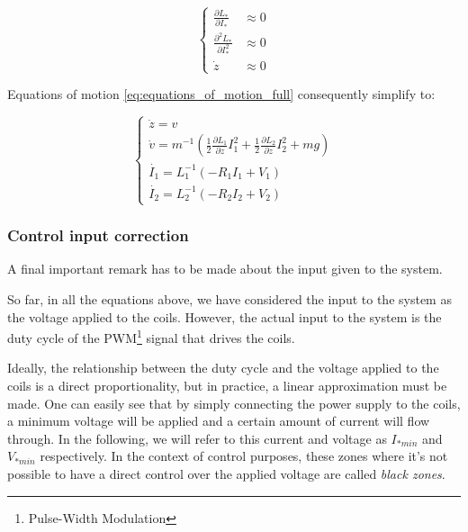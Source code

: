 \begin{equation}
    \begin{cases}
        \frac{\partial L_*}{\partial I_*}     & \approx 0 \\
        \frac{\partial^2 L_*}{\partial I_*^2} & \approx 0 \\
        \dot{z}                               & \approx 0
    \end{cases}
    \label{eq:model_reduction_conditions}
\end{equation}

Equations of motion \ref{eq:equations_of_motion_full} consequently simplify to:

\begin{equation}
    \begin{cases}
        \dot{z} = v                                                                                                                                 \\
        \dot{v} = m^{-1} \left(\frac{1}{2} \frac{\partial L_1}{\partial z} I_1^2 + \frac{1}{2} \frac{\partial L_2}{\partial z} I_2^2 + m g  \right) \\
        \dot{I_1} = L_1^{-1} \left(- R_1 I_1 + V_1 \right)                                                                                          \\
        \dot{I_2} = L_2^{-1} \left(- R_2 I_2 + V_2 \right)
    \end{cases}
    \label{eq:reduced_equations_of_motion}
\end{equation}



\subsubsection{Control input correction}
\label{subsubsec:control_input_correction}

A final important remark has to be made about the input given to the system.

So far, in all the equations above, we have considered the input to the system as the voltage applied to the coils.
However, the actual input to the system is the duty cycle of the PWM\footnote{Pulse-Width Modulation} signal that drives the coils.

Ideally, the relationship between the duty cycle and the voltage applied to the coils is a direct proportionality, but in practice, a linear approximation must be made.
One can easily see that by simply connecting the power supply to the coils, a minimum voltage will be applied and a certain amount of current will flow through.
In the following, we will refer to this current and voltage as $I_{*min}$ and $V_{*min}$ respectively.
In the context of control purposes, these zones where it's not possible to have a direct control over the applied voltage are called \textit{black zones}.

